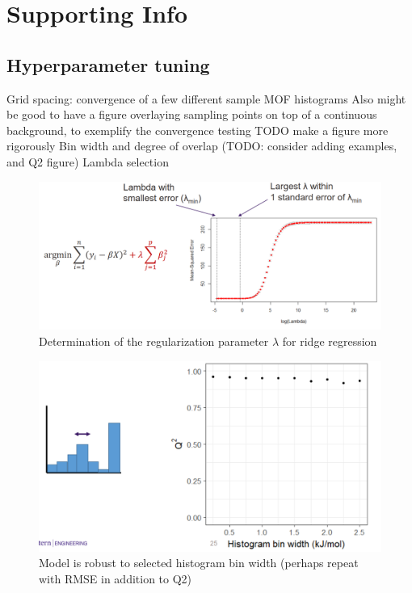 \documentclass[letterpaper]{article}
\begin{document}
\pagebreak
\section{Supporting Info}

\subsection{Hyperparameter tuning}

\begin{outline}
	\1 Grid spacing: convergence of a few different sample MOF histograms
		\2 Also might be good to have a figure overlaying sampling points on top of a continuous background, to exemplify the convergence testing
		\2 TODO make a figure more rigorously
	\1 Bin width and degree of overlap (TODO: consider adding examples, and Q2 figure)
	\1 Lambda selection
	\begin{figure}[H]
		\centering
		\includegraphics[width=0.75\columnwidth]{Figs/lambda.png}
		\caption{Determination of the regularization parameter $\lambda$ for ridge regression}
		\label{fig:lambda}
	\end{figure}
\end{outline}

\begin{figure}[H]
	\centering
	\includegraphics[width=0.75\columnwidth]{Figs/tuning_bin_width.png}
	\caption{Model is robust to selected histogram bin width (perhaps repeat with RMSE in addition to Q2)}
	\label{fig:lambda}
\end{figure}
\end{document}
